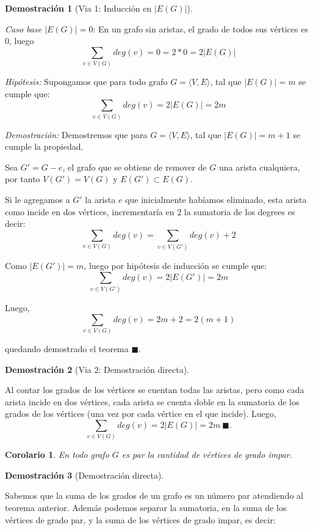 \documentclass[a4paper,1pt]{report}
\newtheorem*{cor}{Corolario}
\newtheorem*{dem}{Demostración}
\begin{document}
\begin{dem}[Via 1: Inducci\'on en $|E(G)|$]\end{dem}

\textit{Caso base $|E(G)| = 0$}: En un grafo sin aristas, el grado de todos sus v\'ertices es $0$, luego $$\sum_{v \in V(G)} deg(v) = 0 = 2 * 0 = 2|E(G)|$$ 

\textit{Hip\'otesis:} Supongamos que para todo grafo $G = \langle V, E \rangle$, tal que $|E(G)| = m$ se cumple que:  $$\sum_{v \in V(G)} deg(v) = 2 |E(G)| = 2m$$

\textit{Demostraci\'on:} Demostremos que para  $G = \langle V, E \rangle$, tal que $|E(G)| = m +1 $ se cumple la propiedad. 

Sea $G' = G - e$, el grafo que se obtiene de remover de $G$ una arista cualquiera, por tanto $V(G') = V(G)$ y $E(G') \subset E(G)$. 

Si le agregamos a $G'$ la arista $e$ que inicialmente hab\'iamos eliminado, esta arista como incide en dos v\'ertices, incrementar\'ia en $2$ la sumatoria de los degrees es decir: $$\sum_{v \in V(G)} deg(v) = \sum_{v \in V(G')} deg(v) +2 $$

Como $|E(G')| = m$, luego por hip\'otesis de inducci\'on se cumple que: $$\sum_{v \in V(G')} deg(v) = 2 |E(G')| = 2m$$

Luego,$$\sum_{v \in V(G)} deg(v) = 2m + 2 = 2(m+1)$$

quedando demostrado el teorema $\blacksquare $.

\begin{dem}[Via 2: Demostraci\'on directa]\end{dem}
Al contar los grados de los vértices se cuentan todas las aristas, pero como cada arista incide en dos v\'ertices, cada arista se cuenta doble en la sumatoria de los grados de los v\'ertices (una vez por cada v\'ertice en el que incide). Luego,
$$\sum_{v \in V(G)} deg(v) = 2 |E(G)| = 2m~ \blacksquare .$$


\begin{cor}
    En todo grafo $G$ es par la cantidad de vértices de grado impar.
\end{cor}

\begin{dem}[Demostraci\'on directa]\end{dem}
Sabemos que la suma de los grados de un grafo es un n\'umero par atendiendo al teorema anterior. Adem\'as podemos separar la sumatoria, en la suma de los v\'ertices de grado par, y la suma de los v\'ertices de grado impar, es decir:
\end{document}
